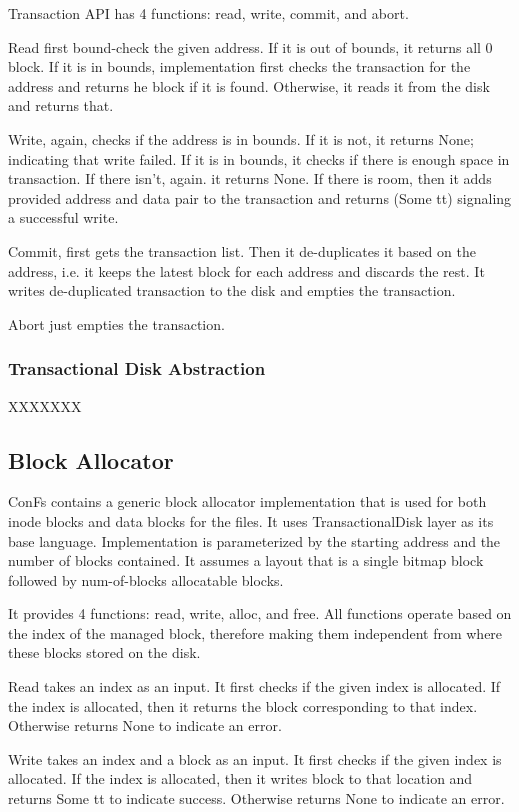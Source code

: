 Transaction API has 4 functions: read, write, commit, and abort.

Read first bound-check the given address. If it is out of bounds, it returns all 0 block. If it is in bounds, implementation first checks the transaction for the address and returns he block if it is found. Otherwise, it reads it from the disk and returns that.

Write, again, checks if the address is in bounds. If it is not, it returns None; indicating that write failed. If it is in bounds, it checks if there is enough space in transaction. If there isn't, again. it returns None. If there is room, then it adds provided address and data pair to the transaction and returns (Some tt) signaling a successful write.

Commit, first gets the transaction list. Then it de-duplicates it based on the address, i.e. it keeps the latest block for each address and discards the rest. It writes de-duplicated transaction to the disk and empties the transaction.

Abort just empties the transaction.

\subsubsection{Transactional Disk Abstraction}
{\color{red} XXXXXXX}

\subsection{Block Allocator}
ConFs contains a generic block allocator implementation that is used for both inode blocks and data blocks for the files. It uses TransactionalDisk layer as its base language. Implementation is parameterized by the starting address and the number of blocks contained. It assumes a layout that is a single bitmap block followed by num-of-blocks allocatable blocks.

It provides 4 functions: read, write, alloc, and free. All functions operate based on the index of the managed block, therefore making them independent from where these blocks stored on the disk.

Read takes an index as an input. It first checks if the given index is allocated. If the index is allocated, then it returns the block corresponding to that index. Otherwise returns None to indicate an error.

Write takes an index and a block as an input. It first checks if the given index is allocated. If the index is allocated, then it writes block to that location and returns Some tt to indicate success. Otherwise returns None to indicate an error.

